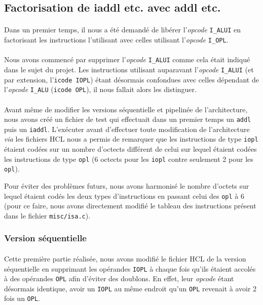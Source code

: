 \documentclass[12pt]{article}
\begin{document}
\subsection{Factorisation de iaddl etc. avec addl etc.}
\paragraph{}Dans un premier temps, il nous a été demandé de libérer l'{\itshape opcode} \verb+I_ALUI+ en factorisant les instructions l'utilisant avec celles utilisant l'{\itshape opcode} \verb+I_OPL+.

\paragraph{}Nous avons commencé par supprimer l'{\itshape opcode} \verb+I_ALUI+ comme cela était indiqué dans le sujet du projet. Les instructions utilisant auparavant l'{\itshape opcode} \verb+I_ALUI+ (et par extension, l'\verb+icode IOPL+) étant désormais confondues avec celles dépendant de l'{\itshape opcode} \verb+I_ALU+ (\verb+icode OPL+), il nous fallait alors les distinguer.

\paragraph{}Avant même de modifier les versions séquentielle et pipelinée de l'architecture, nous avons créé un fichier de test qui effectuait dans un premier temps un \verb+addl+ puis un \verb+iaddl+. L'exécuter avant d'effectuer toute modification de l'architecture {\itshape via} les fichiers HCL nous a permis de remarquer que les instructions de type \verb+iopl+ étaient codées sur un nombre d'octects différent de celui sur lequel étaient codées les instructions de type \verb+opl+ (6 octects pour les \verb+iopl+ contre seulement 2 pour les \verb+opl+).

Pour éviter des problèmes futurs, nous avons harmonisé le nombre d'octets sur lequel étaient codés les deux types d'instructions en passant celui des \verb+opl+ à 6 (pour ce faire, nous avons directement modifié le tableau des instructions présent dans le fichier \verb+misc/isa.c+).

\subsubsection{Version séquentielle}
\paragraph{}Cette première partie réalisée, nous avons modifié le fichier HCL de la version séquentielle en supprimant les opérandes \verb+IOPL+ à chaque fois qu'ils étaient accolés à des opérandes \verb+OPL+ afin d'éviter des doublons. En effet, leur {\itshape opcode} étant désormais identique, avoir un \verb+IOPL+ au même endroit qu'un \verb+OPL+ revenait à avoir 2 fois un \verb+OPL+.
\end{document}
